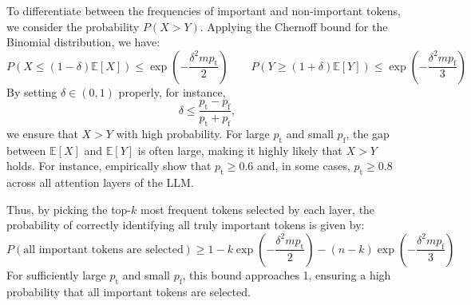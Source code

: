 To differentiate between the frequencies of important and non-important tokens, we consider the probability \( P(X > Y) \). Applying the Chernoff bound for the Binomial distribution, we have:
\begin{equation}
P(X \leq (1-\delta)\mathbb{E}[X]) \leq \exp\left(-\frac{\delta^2 m p_\mathrm{t}}{2}\right)
\qquad
P(Y \geq (1+\delta)\mathbb{E}[Y]) \leq \exp\left(-\frac{\delta^2 m p_\mathrm{f}}{3}\right)
\end{equation}
By setting $\delta \in (0, 1)$ properly, for instance, 
\begin{equation}
\delta \leq \frac{p_\mathrm{t} - p_\mathrm{f}}{p_\mathrm{t} + p_\mathrm{f}},
\end{equation}
we ensure that \( X > Y \) with high probability. For large \( p_\mathrm{t} \) and small \( p_\mathrm{f} \), the gap between \( \mathbb{E}[X] \) and \( \mathbb{E}[Y] \) is often large, making it highly likely that \( X > Y \) holds.
For instance, \cite{snapkv} empirically show that \( p_\mathrm{t} \geq 0.6\) and, in some cases, \(  p_\mathrm{t} \geq 0.8 \) across all attention layers of the LLM.



Thus, by picking the top-$k$ most frequent tokens selected by each layer, the probability of correctly identifying all truly important tokens is given by:
\[
P(\text{all important tokens are selected}) \geq 1 - k \exp\left(-\frac{\delta^2 m p_\mathrm{t}}{2}\right) - (n-k) \exp\left(-\frac{\delta^2 m p_\mathrm{f}}{3}\right)
\]
For sufficiently large \( p_\mathrm{t} \) and small \( p_\mathrm{f} \), this bound approaches 1, ensuring a high probability that all important tokens are selected.





